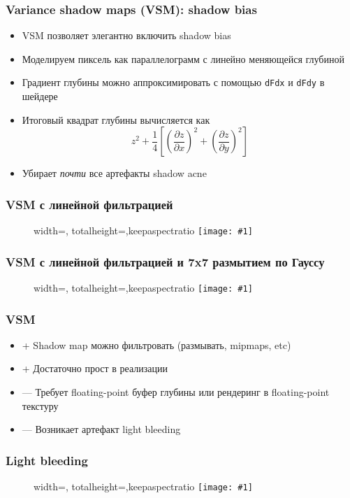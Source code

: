 \documentclass{beamer}
\newcommand{\slideimage}[1]{
  \begin{figure}
    \begin{adjustbox}{width=\textwidth, totalheight=\textheight-2\baselineskip-2\baselineskip,keepaspectratio}
      \texttt{[image: \#1]}
    \end{adjustbox}
  \end{figure}
}
\begin{document}
\begin{frame}[fragile]
\frametitle{Variance shadow maps (VSM): shadow bias}
\begin{itemize}
\item VSM позволяет элегантно включить shadow bias
\pause
\item Моделируем пиксель как параллелограмм с линейно меняющейся глубиной
\pause
\item Градиент глубины можно аппроксимировать с помощью \verb|dFdx| и \verb|dFdy| в шейдере
\pause
\item Итоговый квадрат глубины вычисляется как
\begin{equation}
z^2 + \frac{1}{4}\left[\left(\frac{\partial z}{\partial x}\right)^2 + \left(\frac{\partial z}{\partial y}\right)^2\right]
\end{equation}
\pause
\item Убирает \textit{почти} все артефакты shadow acne
\end{itemize}
\end{frame}

\begin{frame}[fragile]
\frametitle{VSM с линейной фильтрацией}
\slideimage{vsm.png}
\end{frame}

\begin{frame}[fragile]
\frametitle{VSM с линейной фильтрацией и 7x7 размытием по Гауссу}
\slideimage{vsm_gauss.png}
\end{frame}

\begin{frame}[fragile]
\frametitle{VSM}
\begin{itemize}
\item {\color{green}+} Shadow map можно фильтровать (размывать, mipmaps, etc)
\item {\color{green}+} Достаточно прост в реализации
\item {\color{red}—} Требует floating-point буфер глубины или рендеринг в floating-point текстуру
\item {\color{red}—} Возникает артефакт light bleeding
\end{itemize}
\end{frame}

\begin{frame}[fragile]
\frametitle{Light bleeding}
\slideimage{vsm_light_bleeding.png}
\end{frame}
\end{document}
